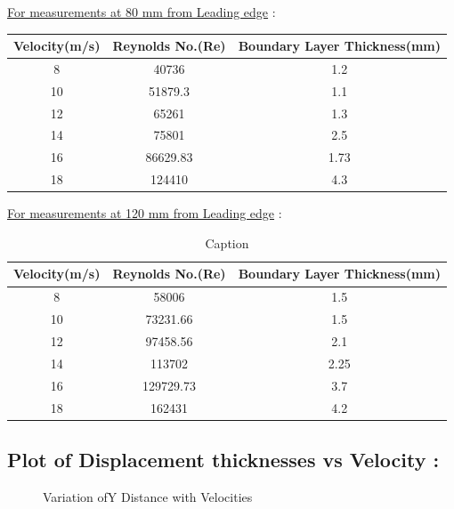 \documentclass[12pt,a4paper]{article}
\begin{document}
 \underline{For measurements at 80 mm from Leading edge} :
\begin{table}[ht]
\centering
\begin{tabular}{|c|c|c|}
 \hline
Velocity(m/s) & Reynolds No.(Re) & Boundary Layer Thickness(mm)   \\
\hline
8 & 40736 & 1.2 \\
\hline
10 & 51879.3 & 1.1 \\
 \hline
12 & 65261 & 1.3 \\
\hline
14 & 75801 & 2.5 \\
\hline
16 & 86629.83 & 1.73 \\
\hline
18 & 124410 & 4.3 \\
\hline
\end{tabular}
\end{table}

 \underline{For measurements at 120 mm from Leading edge} :
\begin{table}[ht]
\centering
\begin{tabular}{|c|c|c|}
 \hline
Velocity(m/s) & Reynolds No.(Re) & Boundary Layer Thickness(mm)   \\
\hline
8 & 58006 & 1.5 \\
\hline
10 & 73231.66 & 1.5 \\
 \hline
12 & 97458.56 & 2.1 \\
\hline
14 & 113702 & 2.25 \\
\hline
16 & 129729.73 & 3.7 \\
\hline
18 & 162431 & 4.2 \\
\hline
\end{tabular}
\caption{Caption}
\end{table}





\subsection{Plot of Displacement thicknesses vs Velocity : } 



\begin{figure}[!ht]
	\begin{center}
	\end{center}
	\caption{Variation ofY Distance with Velocities}
\end{figure}
\end{document}

